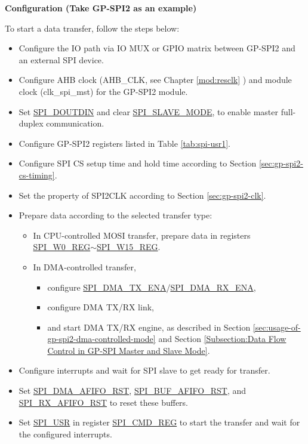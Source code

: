 \documentclass[main\_\_EN.tex]{subfiles}
\begin{document}
\textbf{Configuration (Take GP-SPI2 as an example)}

To start a data transfer, follow the steps below:
\begin{itemize}
    \item Configure the IO path via IO MUX or GPIO matrix between GP-SPI2 and an external SPI device.
    \item Configure AHB clock (AHB\_CLK, see Chapter \ref{mod:resclk} \textit{}) and module clock (clk\_spi\_mst) for the GP-SPI2 module.
    \item Set \hyperref[fielddesc:SPIDOUTDIN]{SPI\_DOUTDIN} and clear \hyperref[fielddesc:SPISLAVEMODE]{SPI\_SLAVE\_MODE}, to enable master full-duplex communication.

    \item Configure GP-SPI2 registers listed in Table \ref{tab:spi-usr1}.

    \item Configure SPI CS setup time and hold time according to Section \ref{sec:gp-spi2-cs-timing}.

    \item Set the property of SPI2CLK according to Section \ref{sec:gp-spi2-clk}.

    \item Prepare data according to the selected transfer type:
    \begin{itemize}
        \item In CPU-controlled MOSI transfer, prepare data in registers \hyperref[regdesc:SPIW0REG]{SPI\_W0\_REG}$\sim$\hyperref[regdesc:SPIW15REG]{SPI\_W15\_REG}.

        \item In DMA-controlled transfer,
        \begin{itemize}
            \item configure \hyperref[fielddesc:SPIDMATXENA]{SPI\_DMA\_TX\_ENA}/\hyperref[fielddesc:SPIDMARXENA]{SPI\_DMA\_RX\_ENA},
            \item configure DMA TX/RX link,
            \item and start DMA TX/RX engine, as described in Section \ref{sec:usage-of-gp-spi2-dma-controlled-mode} and Section \ref{Subsection:Data Flow Control in GP-SPI Master and Slave Mode}.
        \end{itemize}
    \end{itemize}

    \item Configure interrupts and wait for SPI slave to get ready for transfer.

    \item Set \hyperref[fielddesc:SPIDMAAFIFORST]{SPI\_DMA\_AFIFO\_RST}, \hyperref[fielddesc:SPIBUFAFIFORST]{SPI\_BUF\_AFIFO\_RST}, and \hyperref[fielddesc:SPIRXAFIFORST]{SPI\_RX\_AFIFO\_RST} to reset these buffers.

    \item Set \hyperref[fielddesc:SPIUSR]{SPI\_USR} in register \hyperref[regdesc:SPICMDREG]{SPI\_CMD\_REG} to start the transfer and wait for the configured interrupts.

\end{itemize}
\end{document}
